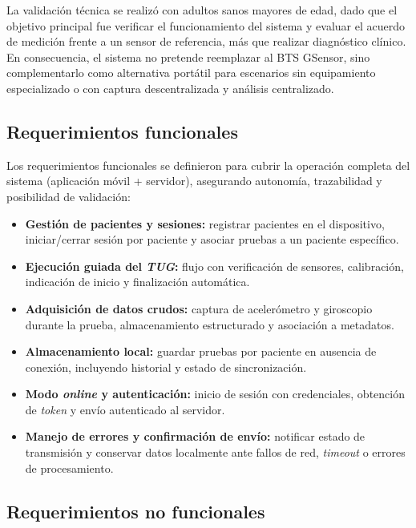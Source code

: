 \documentclass[12pt]{report}
\begin{document}
\begin{justify}
    La validación técnica se realizó con adultos sanos mayores de edad, dado que el objetivo principal fue verificar el funcionamiento del sistema y evaluar el acuerdo de medición frente a un sensor de referencia, más que realizar diagnóstico clínico. En consecuencia, el sistema no pretende reemplazar al BTS GSensor, sino complementarlo como alternativa portátil para escenarios sin equipamiento especializado o con captura descentralizada y análisis centralizado.

    \subsection{Requerimientos funcionales}
    \label{subsec:req-funcionales}

    Los requerimientos funcionales se definieron para cubrir la operación completa del sistema (aplicación móvil + servidor), asegurando autonomía, trazabilidad y posibilidad de validación:

    \begin{itemize}
        \item \textbf{Gestión de pacientes y sesiones:} registrar pacientes en el dispositivo, iniciar/cerrar sesión por paciente y asociar pruebas a un paciente específico.
        \item \textbf{Ejecución guiada del \textit{TUG}:} flujo con verificación de sensores, calibración, indicación de inicio y finalización automática.
        \item \textbf{Adquisición de datos crudos:} captura de acelerómetro y giroscopio durante la prueba, almacenamiento estructurado y asociación a metadatos.
        \item \textbf{Almacenamiento local:} guardar pruebas por paciente en ausencia de conexión, incluyendo historial y estado de sincronización.
        \item \textbf{Modo \textit{online} y autenticación:} inicio de sesión con credenciales, obtención de \textit{token} y envío autenticado al servidor.
        \item \textbf{Manejo de errores y confirmación de envío:} notificar estado de transmisión y conservar datos localmente ante fallos de red, \textit{timeout} o errores de procesamiento.
    \end{itemize}

    \subsection{Requerimientos no funcionales}
    \label{subsec:req-no-funcionales}


\end{justify}
\end{document}
